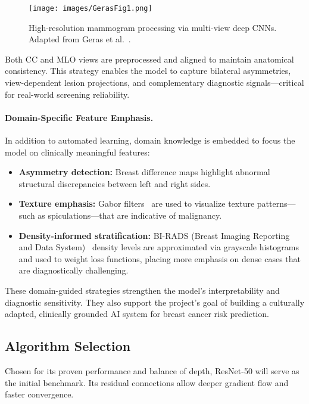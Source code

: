 \documentclass[12pt]{article}
\begin{document}
\begin{figure}[H]
    \centering
    \texttt{[image: images/GerasFig1.png]}
    \caption{High-resolution mammogram processing via multi-view deep CNNs. Adapted from Geras et al.~\cite{8}.}
    \label{fig:geras}
\end{figure}

Both CC and MLO views are preprocessed and aligned to maintain anatomical consistency. This strategy enables the model to capture bilateral asymmetries, view-dependent lesion projections, and complementary diagnostic signals—critical for real-world screening reliability.

\paragraph{Domain-Specific Feature Emphasis.}
In addition to automated learning, domain knowledge is embedded to focus the model on clinically meaningful features:

\begin{itemize}
    \item \textbf{Asymmetry detection:} Breast difference maps highlight abnormal structural discrepancies between left and right sides.
    \item \textbf{Texture emphasis:} Gabor filters~\cite{20} are used to visualize texture patterns—such as spiculations—that are indicative of malignancy.
    \item \textbf{Density-informed stratification:} BI-RADS (Breast Imaging Reporting and Data System)~\cite{16} density levels are approximated via grayscale histograms and used to weight loss functions, placing more emphasis on dense cases that are diagnostically challenging.
\end{itemize}

These domain-guided strategies strengthen the model’s interpretability and diagnostic sensitivity. They also support the project’s goal of building a culturally adapted, clinically grounded AI system for breast cancer risk prediction.

\subsection{Algorithm Selection}
Chosen for its proven performance and balance of depth, ResNet-50 will serve as the initial benchmark. Its residual connections allow deeper gradient flow and faster convergence.
\end{document}
